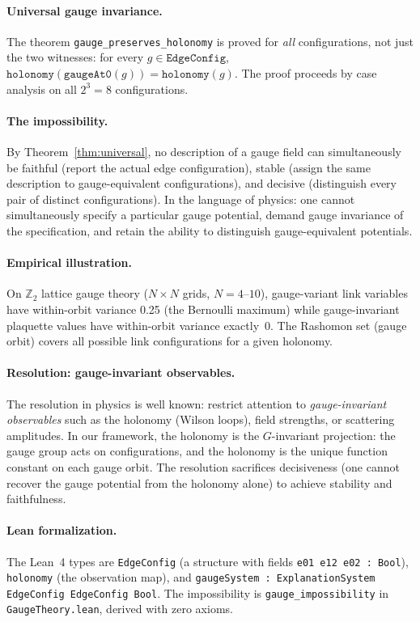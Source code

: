 \paragraph{Universal gauge invariance.}
The theorem \texttt{gauge\_preserves\_holonomy} is proved for \emph{all}
configurations, not just the two witnesses: for every $g \in \texttt{EdgeConfig}$,
$\texttt{holonomy}(\texttt{gaugeAt0}(g)) = \texttt{holonomy}(g)$.  The proof
proceeds by case analysis on all $2^3 = 8$ configurations.

\paragraph{The impossibility.}
By Theorem~\ref{thm:universal}, no description of a gauge field can
simultaneously be faithful (report the actual edge configuration), stable
(assign the same description to gauge-equivalent configurations), and decisive
(distinguish every pair of distinct configurations).  In the language of
physics: one cannot simultaneously specify a particular gauge potential,
demand gauge invariance of the specification, and retain the ability to
distinguish gauge-equivalent potentials.

\paragraph{Empirical illustration.}
On $\mathbb{Z}_2$ lattice gauge theory ($N \times N$ grids, $N = 4$--$10$),
gauge-variant link variables have within-orbit variance 0.25 (the Bernoulli
maximum) while gauge-invariant plaquette values have within-orbit variance
exactly~0.  The Rashomon set (gauge orbit) covers all possible link
configurations for a given holonomy.

\paragraph{Resolution: gauge-invariant observables.}
The resolution in physics is well known: restrict attention to
\emph{gauge-invariant observables} such as the holonomy (Wilson loops),
field strengths, or scattering amplitudes.  In our framework, the holonomy
is the $G$-invariant projection: the gauge group acts on configurations,
and the holonomy is the unique function constant on each gauge orbit.
The resolution sacrifices decisiveness (one cannot recover the gauge
potential from the holonomy alone) to achieve stability and faithfulness.

\paragraph{Lean formalization.}
The Lean~4 types are \texttt{EdgeConfig} (a structure with fields
\texttt{e01 e12 e02 : Bool}), \texttt{holonomy} (the observation map),
and \texttt{gaugeSystem : ExplanationSystem EdgeConfig EdgeConfig Bool}.
The impossibility is \texttt{gauge\_impossibility} in
\texttt{GaugeTheory.lean}, derived with zero axioms.
